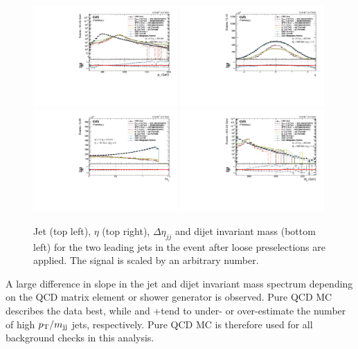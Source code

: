 \begin{figure}[h!]
\centering
\includegraphics[width=0.49\textwidth]{figures/analysis/search2/AN-16-235/plots/qcdcp_Pt.pdf}
\includegraphics[width=0.49\textwidth]{figures/analysis/search2/AN-16-235/plots/qcdcp_Eta.pdf}\\
\includegraphics[width=0.49\textwidth]{figures/analysis/search2/AN-16-235/plots/qcdcp_DeltaEta.pdf}
\includegraphics[width=0.49\textwidth]{figures/analysis/search2/AN-16-235/plots/qcdcp_Mjj.pdf}
\caption{Jet \PT{} (top left), $\eta$ (top right), $\Delta \eta_{jj}$ and dijet invariant mass (bottom left) for the two leading jets in the event after loose preselections are applied. The signal is scaled by an arbitrary number.}
\label{fig:searchII:kinematics-all}
\end{figure}
A large difference in slope in the jet \PT and dijet invariant mass spectrum depending on the QCD matrix element or shower generator is observed. Pure \PYTHIA QCD MC describes the data best, while \HERWIG{++} and \amcatnlo{}+\PYTHIA tend to under- or over-estimate the number of high $p_{\mathrm{T}}/m_\mathrm{jj}$ jets, respectively. Pure \PYTHIA QCD MC is therefore used for all background checks in this analysis.

